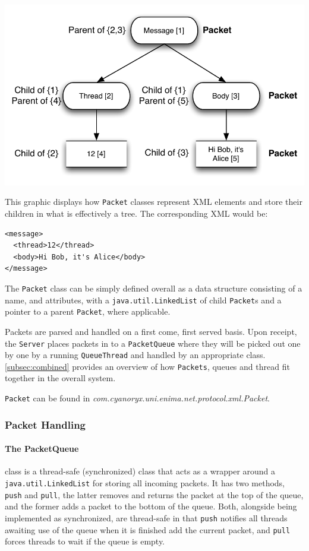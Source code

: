     \begin{center}
      \includegraphics[scale=0.7]{./Figures/Ch6/6-4-4-2.pdf}
    \end{center}
    
    This graphic displays how \verb!Packet! classes represent XML elements and store their children in what is effectively a tree. The corresponding XML would be:
    
    \begin{verbatim}
<message>
  <thread>12</thread>
  <body>Hi Bob, it's Alice</body>
</message>
    \end{verbatim}
    
    The \verb!Packet! class can be simply defined overall as a data structure consisting of a name, and attributes, with a \verb!java.util.LinkedList! of child \verb!Packet!s and a pointer to a parent \verb!Packet!, where applicable.
    
    Packets are parsed and handled on a first come, first served basis. Upon receipt, the \verb!Server! places packets in to a \verb!PacketQueue! where they will be picked out one by one by a running \verb!QueueThread! and handled by an appropriate class. \textsection\ref{subsec:combined} provides an overview of how \verb!Packets!, queues and thread fit together in the overall system.
    
    \verb!Packet! can be found in \emph{com.cyanoryx.uni.enima.net.protocol.xml.Packet}.
    
    \subsubsection{Packet Handling}
    \label{subsubsec:packet_queue}
    
      \paragraph{The PacketQueue} class is a thread-safe (synchronized) class that acts as a wrapper around a \verb!java.util.LinkedList! for storing all incoming packets. It has two methods, \verb!push! and \verb!pull!, the latter removes and returns the packet at the top of the queue, and the former adds a packet to the bottom of the queue. Both, alongside being implemented as synchronized, are thread-safe in that \verb!push! notifies all threads awaiting use of the queue when it is finished add the current packet, and \verb!pull! forces threads to wait if the queue is empty.
      
